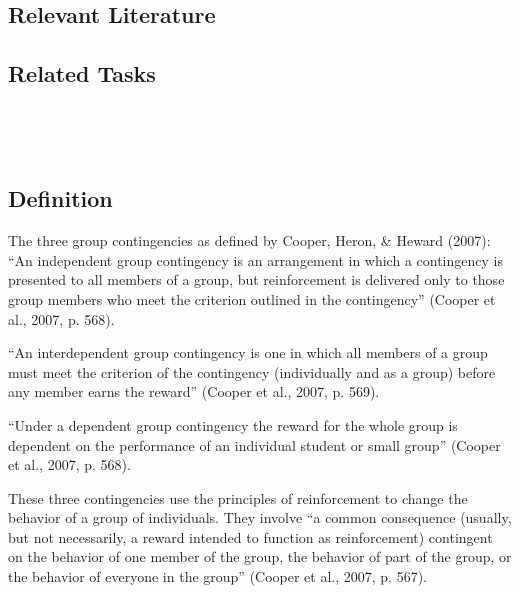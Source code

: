 \subsection{Relevant Literature}
\begin{refsection}
\nocite{test,alang2017police,clayton2018black}
\printbibliography[heading=none]
\end{refsection}
%
\subsection{Related Tasks}
\fourkTwo{}\\
\fourFKFourtyTwo{}\\
%
%

%
%
\section[\foureFive{}]{\foureFive{}%
              }
\subsection{Definition}
The three group contingencies as defined by Cooper, Heron, \& Heward (2007):\\
 ``An independent group contingency is an arrangement in which a contingency is presented to all members of a group, but reinforcement is delivered only to those group members who meet the criterion outlined in the contingency'' (Cooper et al., 2007, p. 568).

``An interdependent group contingency is one in which all members of a group must meet the criterion of the contingency (individually and as a group) before any member earns the reward'' (Cooper et al., 2007, p. 569).

``Under a dependent group contingency the reward for the whole group is dependent on the performance of an individual student or small group'' (Cooper et al., 2007, p. 568).

These three contingencies use the principles of reinforcement to change the behavior of a group of individuals. They involve ``a common consequence (usually, but not necessarily, a reward intended to function as reinforcement) contingent on the behavior of one member of the group, the behavior of part of the group, or the behavior of everyone in the group'' (Cooper et al., 2007, p. 567).
%
